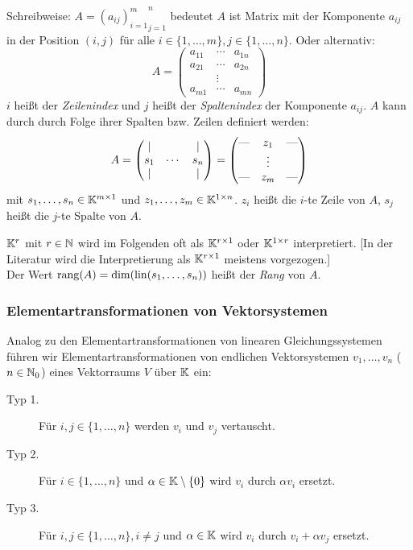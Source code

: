 Schreibweise: $ A = {{(a_{ij})}_{i=1}^m}_{j=1}^n $ bedeutet $ A $ ist Matrix mit der Komponente $ a_{ij} $ in der Position $ (i,j) $ für alle $ i \in \{ 1, \ldots, m \}, j \in \{ 1, \ldots, n \} $. Oder alternativ:
\begin{equation}
	A =
	\left( \begin{matrix}
	a_{11} & \cdots & a_{1n}\\
	a_{21} & \cdots & a_{2n}\\
	 & \vdots & \\
	a_{m1} & \cdots & a_{mn}
	\end{matrix} \right)
\end{equation}
$ i $ heißt der \emph{Zeilenindex} und $ j $ heißt der \emph{Spaltenindex} der Komponente $ a_{ij} $. $ A $ kann durch durch Folge ihrer Spalten bzw. Zeilen definiert werden:
\begin{equation}
	A =
	\begin{pmatrix}
	| & & | \\
	s_1 & \cdots & s_n \\
	| & & |
	\end{pmatrix}
	=
	\begin{pmatrix}
	\text{\textemdash} & z_1 & \text{\textemdash} \\
	& \vdots & \\
	\text{\textemdash} & z_m & \text{\textemdash}
	\end{pmatrix}
\end{equation}
mit $ s_1, \ldots, s_n \in \mathbb K^{m \times 1} $ und $ z_1, \ldots, z_m \in \mathbb K^{1 \times n} $. $ z_i $ heißt die $ i $-te Zeile von $ A $, $ s_j $ heißt die $ j $-te Spalte von $ A $.

$ \mathbb K^r $ mit $ r \in \mathbb N $ wird im Folgenden oft als $ \mathbb K^{r \times 1} $ oder $ \mathbb K^{1 \times r} $ interpretiert. [In der Literatur wird die Interpretierung als $ \mathbb K^{r \times 1} $ meistens vorgezogen.]\\[10pt]
Der Wert $ \operatorname{rang}(A) = \dim(\operatorname{lin}(s_1, \ldots, s_n)) $ heißt der \emph{Rang} von $ A $.

\subsubsection{Elementartransformationen von Vektorsystemen}

Analog zu den Elementartransformationen von linearen Gleichungssystemen führen wir Elementartransformationen von endlichen Vektorsystemen $ v_1, \ldots, v_n $ ($ n \in \mathbb N_0 $) eines Vektorraums $ V $ über $ \mathbb K $ ein:
\begin{description}
	\item[Typ 1.]
		Für $ i,j \in \{ 1, \ldots, n \} $ werden $ v_i $ und $ v_j $ vertauscht.
	\item[Typ 2.]
		Für $ i \in \{ 1, \ldots, n \} $ und $ \alpha \in \mathbb K \setminus \{ 0 \} $ wird $ v_i $ durch $ \alpha v_i $ ersetzt.
	\item[Typ 3.]
		Für $ i,j \in \{ 1, \ldots, n \}, i \neq j $ und $ \alpha \in \mathbb K $ wird $ v_i $ durch $ v_i + \alpha v_j $ ersetzt.
\end{description}

